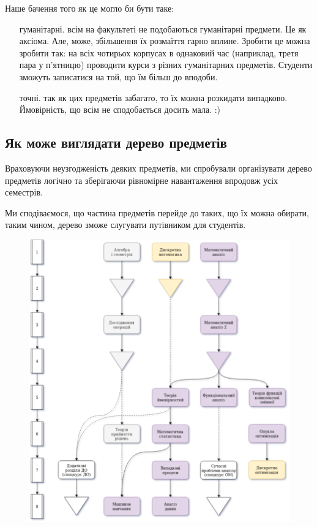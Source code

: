 \documentclass[14pt, a4paper]{extarticle}  %
\begin{document}
Наше бачення того як це могло би бути таке:
\begin{itemize}
    \item [гуманітарні.] всім на факультеті не подобаються гуманітарні предмети. Це як аксіома. Але, може, збільшення їх розмаїття гарно вплине. Зробити це можна зробити так: на всіх чотирьох корпусах в однаковий час (наприклад, третя пара у п'ятницю) проводити курси з різних гуманітарних предметів. Студенти зможуть записатися на той, що їм більш до вподоби. 
    \item [точні.] так як цих предметів забагато, то їх можна розкидати випадково. Ймовірність, що всім не сподобається досить мала. :) 
\end{itemize}


\subsection{Як може виглядати дерево предметів}
Враховуючи неузгодженість деяких предметів, ми спробували організувати дерево предметів логічно та зберігаючи рівномірне навантаження впродовж усіх семестрів.

Ми сподіваємося, що частина предметів перейде до таких, що їх можна обирати, таким чином, дерево зможе слугувати путівником для студентів. 

\begin{figure}[ht]
\centering
\includegraphics[scale=0.57]{CourseworkTree_1.png}
\end{figure}
\end{document}
